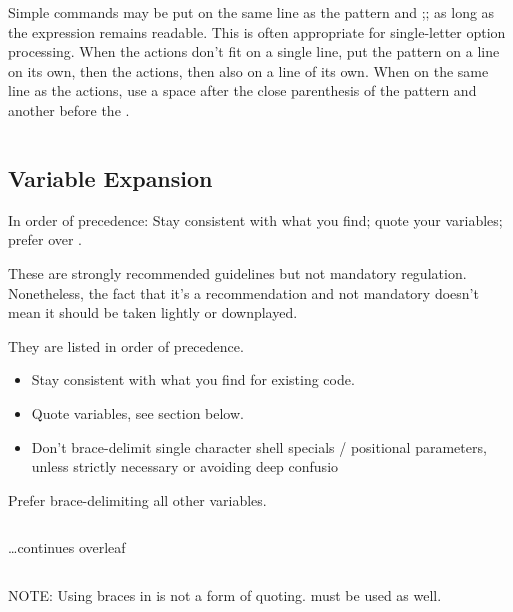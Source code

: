 \documentclass{article}
\begin{document}
\inputminted[frame=single,firstline=89, lastline=101,linenos]{bash}{./styleguide.bash}

Simple commands may be put on the same line as the pattern and ;; as long as the expression remains readable. This is often appropriate for single-letter option processing. When the actions don’t fit on a single line, put the pattern on a line on its own, then the actions, then \code{;;} also on a line of its own. When on the same line as the actions, use a space after the close parenthesis of the pattern and another before the \code{;;}.

\inputminted[frame=single,firstline=103, lastline=115,linenos]{bash}{./styleguide.bash}

\subsection{Variable Expansion}
\label{subsec:var_exp}
In order of precedence: Stay consistent with what you find; quote your variables; prefer  over .

These are strongly recommended guidelines but not mandatory regulation. Nonetheless, the fact that it’s a recommendation and not mandatory doesn’t mean it should be taken lightly or downplayed.

They are listed in order of precedence.
\begin{itemize}
    \item Stay consistent with what you find for existing code.
    \item Quote variables, see  section below.
    \item Don’t brace-delimit single character shell specials / positional parameters, unless strictly necessary or avoiding deep confusio
\end{itemize}

Prefer brace-delimiting all other variables.
\inputminted[frame=single,firstline=117, lastline=135,linenos]{bash}{./styleguide.bash}
\begin{center}
\vspace{4em}
\ldots continues overleaf    
\end{center}

\newpage
\inputminted[frame=single,firstline=137, lastline=146,linenos]{bash}{./styleguide.bash}
NOTE: Using braces in  is not a form of quoting.  must be used as well.
\end{document}
